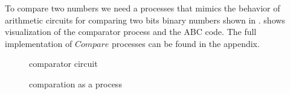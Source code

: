 To compare two numbers we need a processes that mimics the behavior of arithmetic circuits for comparing two bits binary numbers shown in 
.
 shows visualization of the comparator process and the ABC code.
The full implementation of $Compare$ processes can be found in the appendix.
\begin{figure}[H]%
\centering
{}
\caption{comparator circuit}
\label{tra_comparator_circuit}%
\end{figure}


\begin{figure}[H]%
\centering
{}%
\hspace{\fill}
%
\hspace{1em}%
%
\caption{comparation as a process}
\label{tra_comparation}%
\end{figure}
